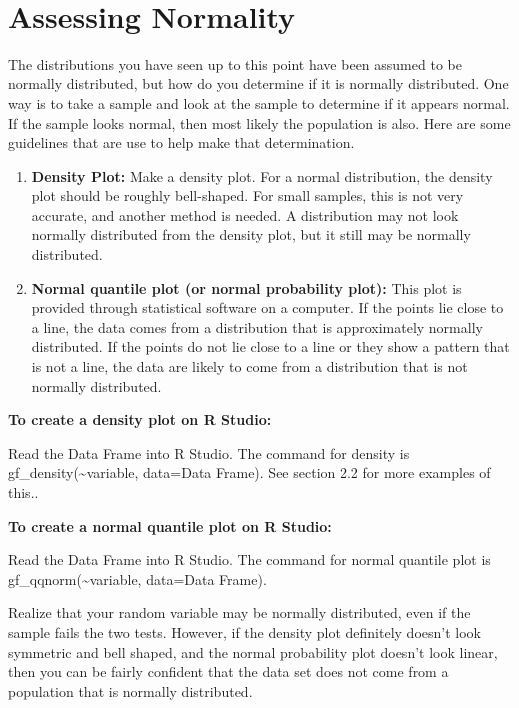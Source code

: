 \documentclass[]{book}
\begin{document}
\textbf{\\
}

\hypertarget{assessing-normality}{%
\section{Assessing Normality}\label{assessing-normality}}

The distributions you have seen up to this point have been assumed to be normally distributed, but how do you determine if it is normally distributed. One way is to take a sample and look at the sample to determine if it appears normal. If the sample looks normal, then most likely the population is also. Here are some guidelines that are use to help make that determination.

\begin{enumerate}
\def\labelenumi{\arabic{enumi}.}
\item
  \textbf{Density Plot:} Make a density plot. For a normal distribution, the density plot should be roughly bell-shaped. For small samples, this is not very accurate, and another method is needed. A distribution may not look normally distributed from the density plot, but it still may be normally distributed.
\item
  \textbf{Normal quantile plot (or normal probability plot):} This plot is provided through statistical software on a computer. If the points lie close to a line, the data comes from a distribution that is approximately normally distributed. If the points do not lie close to a line or they show a pattern that is not a line, the data are likely to come from a distribution that is not normally distributed.
\end{enumerate}

\textbf{To create a density plot on R Studio:}

Read the Data Frame into R Studio. The command for density is gf\_density(\textasciitilde{}variable, data=Data Frame). See section 2.2 for more examples of this..

\textbf{To create a normal quantile plot on R Studio:}

Read the Data Frame into R Studio. The command for normal quantile plot is gf\_qqnorm(\textasciitilde{}variable, data=Data Frame).

Realize that your random variable may be normally distributed, even if the sample fails the two tests. However, if the density plot definitely doesn't look symmetric and bell shaped, and the normal probability plot doesn't look linear, then you can be fairly confident that the data set does not come from a population that is normally distributed.
\end{document}
